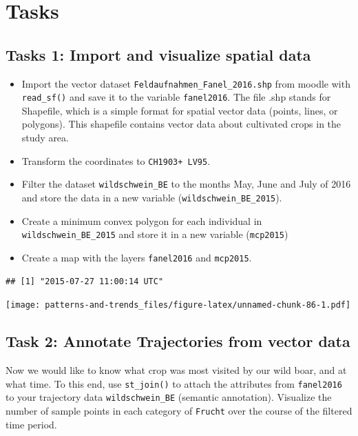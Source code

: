 \documentclass[
]{book}
\providecommand{\tightlist}{%
  \setlength{\itemsep}{0pt}\setlength{\parskip}{0pt}}
\begin{document}
\hypertarget{tasks}{%
\section{Tasks}\label{tasks}}

\hypertarget{tasks-1-import-and-visualize-spatial-data}{%
\subsection{Tasks 1: Import and visualize spatial data}\label{tasks-1-import-and-visualize-spatial-data}}

\begin{itemize}
\tightlist
\item
  Import the vector dataset \texttt{Feldaufnahmen\_Fanel\_2016.shp} from moodle with \texttt{read\_sf()} and save it to the variable \texttt{fanel2016}. The file .shp stands for Shapefile, which is a simple format for spatial vector data (points, lines, or polygons). This shapefile contains vector data about cultivated crops in the study area.
\item
  Transform the coordinates to \texttt{CH1903+\ LV95}.
\item
  Filter the dataset \texttt{wildschwein\_BE} to the months May, June and July of 2016 and store the data in a new variable (\texttt{wildschwein\_BE\_2015}).
\item
  Create a minimum convex polygon for each individual in \texttt{wildschwein\_BE\_2015} and store it in a new variable (\texttt{mcp2015})
\item
  Create a map with the layers \texttt{fanel2016} and \texttt{mcp2015}.
\end{itemize}

\begin{verbatim}
## [1] "2015-07-27 11:00:14 UTC"
\end{verbatim}

\texttt{[image: patterns-and-trends\_files/figure-latex/unnamed-chunk-86-1.pdf]}

\hypertarget{task-2-annotate-trajectories-from-vector-data}{%
\subsection{Task 2: Annotate Trajectories from vector data}\label{task-2-annotate-trajectories-from-vector-data}}

Now we would like to know what crop was most visited by our wild boar, and at what time. To this end, use \texttt{st\_join()} to attach the attributes from \texttt{fanel2016} to your trajectory data \texttt{wildschwein\_BE} (semantic annotation). Visualize the number of sample points in each category of \texttt{Frucht} over the course of the filtered time period.
\end{document}
